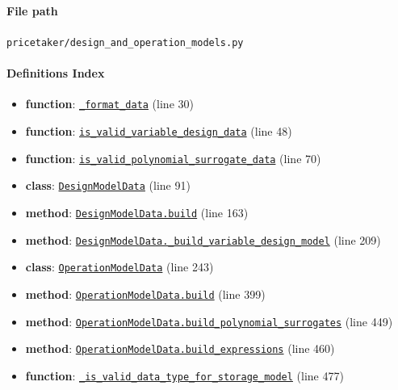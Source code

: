 \documentclass[11pt]{report}
\begin{document}
\paragraph{File path} \texttt{pricetaker/design\_and\_operation\_models.py}
\paragraph{Definitions Index}
\begin{itemize}[leftmargin=*]
  \item \textbf{function}: \hyperref[def:pricetaker-design_and_operation_models.py:_format_data:L30]{\texttt{\_format\_data}} (line 30)
  \item \textbf{function}: \hyperref[def:pricetaker-design_and_operation_models.py:is_valid_variable_design_data:L48]{\texttt{is\_valid\_variable\_design\_data}} (line 48)
  \item \textbf{function}: \hyperref[def:pricetaker-design_and_operation_models.py:is_valid_polynomial_surrogate_data:L70]{\texttt{is\_valid\_polynomial\_surrogate\_data}} (line 70)
  \item \textbf{class}: \hyperref[def:pricetaker-design_and_operation_models.py:DesignModelData:L91]{\texttt{DesignModelData}} (line 91)
  \item \textbf{method}: \hyperref[def:pricetaker-design_and_operation_models.py:DesignModelData.build:L163]{\texttt{DesignModelData.build}} (line 163)
  \item \textbf{method}: \hyperref[def:pricetaker-design_and_operation_models.py:DesignModelData._build_variable_design_model:L209]{\texttt{DesignModelData.\_build\_variable\_design\_model}} (line 209)
  \item \textbf{class}: \hyperref[def:pricetaker-design_and_operation_models.py:OperationModelData:L243]{\texttt{OperationModelData}} (line 243)
  \item \textbf{method}: \hyperref[def:pricetaker-design_and_operation_models.py:OperationModelData.build:L399]{\texttt{OperationModelData.build}} (line 399)
  \item \textbf{method}: \hyperref[def:pricetaker-design_and_operation_models.py:OperationModelData.build_polynomial_surrogates:L449]{\texttt{OperationModelData.build\_polynomial\_surrogates}} (line 449)
  \item \textbf{method}: \hyperref[def:pricetaker-design_and_operation_models.py:OperationModelData.build_expressions:L460]{\texttt{OperationModelData.build\_expressions}} (line 460)
  \item \textbf{function}: \hyperref[def:pricetaker-design_and_operation_models.py:_is_valid_data_type_for_storage_model:L477]{\texttt{\_is\_valid\_data\_type\_for\_storage\_model}} (line 477)

\end{itemize}
\end{document}
